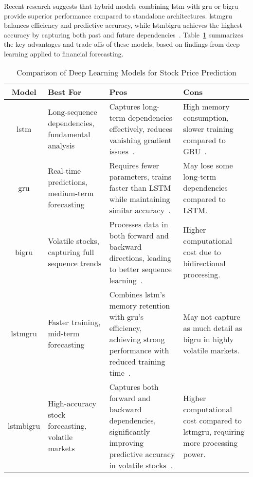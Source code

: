 Recent research suggests that hybrid models combining \acrshort{lstm} with 
\acrshort{gru} or \acrshort{bigru} provide superior performance compared to standalone
architectures. \acrshort{lstmgru} balances efficiency and predictive accuracy, while 
\acrshort{lstmbigru} achieves the highest accuracy by capturing both past and future
dependencies~\parencite{chang2024StockPrediction}. Table~\ref{tab:stock_models} summarizes the key advantages and trade-offs of these models, based on findings from deep learning applied to financial forecasting.

\begin{table}[H]
    \centering
    \caption{Comparison of Deep Learning Models for Stock Price Prediction}
    \label{tab:stock_models}
    \begin{tabular}{cp{4cm}p{4cm}p{4cm}}
        \hline
        \textbf{Model} & \textbf{Best For} & \textbf{Pros} & \textbf{Cons} \\
        \hline
        \acrshort{lstm} & Long-sequence dependencies, fundamental analysis & Captures
        long-term dependencies effectively, reduces vanishing gradient
        issues~\parencite{shaban2024SMPDL}. & High memory consumption, slower training 
        compared to GRU~\parencite{chang2024StockPrediction}. \\
        \acrshort{gru} & Real-time predictions, medium-term forecasting & Requires 
        fewer parameters, trains faster than LSTM while maintaining similar
        accuracy~\parencite{guo2024LSTMStock}. & May lose some long-term dependencies 
        compared to LSTM. \\
        \acrshort{bigru} & Volatile stocks, capturing full sequence trends & Processes 
        data in both forward and backward directions, leading to better sequence
        learning~\parencite{shaban2024SMPDL}. & Higher computational cost due to 
        bidirectional processing. \\
        \acrshort{lstmgru} & Faster training, mid-term forecasting & 
        Combines \acrshort{lstm}'s memory retention with \acrshort{gru}’s efficiency,
        achieving strong performance with reduced training 
        time~\parencite{chang2024StockPrediction}. & May not capture as much detail as 
        \acrshort{bigru} in highly volatile markets. \\
        \acrshort{lstmbigru} & High-accuracy stock forecasting, volatile markets & 
        Captures both forward and backward dependencies, significantly improving 
        predictive accuracy in volatile stocks~\parencite{shaban2024SMPDL}. & 
        Higher computational cost compared to \acrshort{lstmgru}, requiring more 
        processing power. \\ \hline
    \end{tabular}
\end{table}

